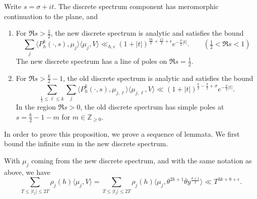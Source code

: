 \begin{proposition}\label{prop:hyperboloid_discrete_props}
  Write $s = \sigma + it$.
  The discrete spectrum component has meromorphic continuation to the plane, and
  \begin{enumerate}

    \item For $\Re s > \frac{1}{2}$, the new discrete spectrum is analytic and satisfies
      the bound
      \begin{equation}
        \sum_j \langle P_h^k(\cdot, s), \mu_j\rangle \langle \mu_j, V \rangle \ll_{h,
        \epsilon} (1 + \lvert t \rvert)^{\frac{7k}{2} + \frac{15}{2} + \epsilon}
        e^{-\frac{\pi}{2} \lvert t \rvert}. \qquad (\tfrac{1}{2} < \Re s < 1)
      \end{equation}
      The new discrete spectrum has a line of poles on $\Re s = \frac{1}{2}$.

    \item For $\Re s > \frac{k}{2} - 1$, the old discrete spectrum is analytic and
      satisfies the bound
      \begin{equation}
        \sum_{\frac{1}{2} \leq \ell \leq k} \sum_j \langle P_h^k(\cdot, s),
        \mu_{j,\ell}\rangle \langle \mu_{j,\ell}, V \rangle \ll (1 + \lvert t
      \rvert)^{\frac{k}{2} - \frac{3}{2} + \sigma} e^{-\frac{\pi}{2}\lvert t \rvert}.
      \end{equation}
      In the region $\Re s > 0$, the old discrete spectrum has simple poles at $s =
      \frac{k}{2} - 1 - m$ for $m \in \mathbb{Z}_{\geq 0}$.

  \end{enumerate}
\end{proposition}


In order to prove this proposition, we prove a sequence of lemmata.
We first bound the infinite sum in the new discrete spectrum.


\begin{lemma}\label{lem:discrete_newspectrum_innerproduct_bound}
  With $\mu_j$ coming from the new discrete spectrum, and with the same notation as above,
  we have
  \begin{equation}
    \sum_{T \leq \lvert t_j \rvert \leq 2T} \rho_j(h) \langle \mu_j, V \rangle = \sum_{T
    \leq \lvert t_j \rvert \leq 2T} \rho_j(h) \langle \mu_j, \theta^{2k+1}
    \overline{\theta} y^{\frac{k+1}{2}} \rangle \ll T^{3k + 8 + \epsilon}.
  \end{equation}
\end{lemma}

